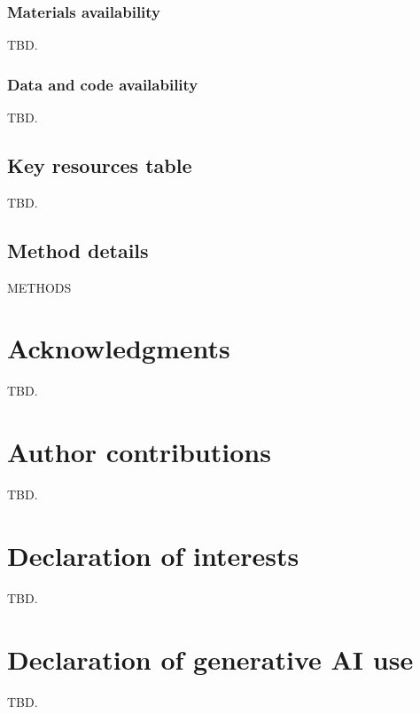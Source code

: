 \documentclass[11pt]{article}
\begin{document}
\subsubsection{Materials availability}
TBD.
\subsubsection{Data and code availability}
TBD. %
\subsection{Key resources table}
TBD.
\subsection{Method details}
{METHODS}

\section*{Acknowledgments}
TBD.

\section*{Author contributions}
TBD.

\section*{Declaration of interests}
TBD.

\section*{Declaration of generative AI use}
TBD.



\end{document}

